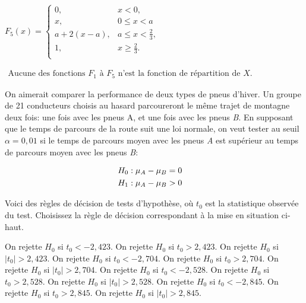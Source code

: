 \begin{questions}
\begin{checkboxes}
     \vspace{0.3cm}
     \CorrectChoice $F_5(x)=\left\{\begin{array}{ll}
     0, & x<0,\\
     x, & 0\le x<a \\ 
     a+2(x-a), & a\le x < \frac{2}{3}, \\ 
     1, & x\ge\frac{2}{3}.\\
     \end{array}\right.$

\vspace{0.3cm}
     \choice $\begin{array}{ll}
     \text{Aucune des fonctions\ } 
     \text{$F_1$ à $F_5$ n'est la\ } 
     \text{fonction de répartition de $X$.}
     \end{array}$
  \end{checkboxes}\medskip


 \question[4]

On aimerait comparer la performance de deux types de pneus d'hiver. Un groupe de 21 conducteurs choisis au hasard parcoureront le même trajet de montagne deux fois: une fois avec les pneus {A}, et une fois avec les pneus {\it B}. En supposant que le temps de parcours de la route suit une loi normale, on veut tester au seuil $\alpha=0,01$ si le temps de parcours moyen avec les pneus {\it A} est supérieur au temps de parcours moyen avec les pneus {\it B}:



\begin{align*}
    H_0&:\mu_{A} - \mu_{B} = 0 \cr
    H_1&:\mu_{A} - \mu_{B} > 0
\end{align*}

Voici des règles de décision de tests d'hypothèse, où $t_0$ est la statistique observée du test. Choisissez la règle de décision correspondant à la mise en situation ci-haut.

\begin{checkboxes}
    \choice On rejette $H_0$ si $t_0 < -2,423$.
    \choice On rejette $H_0$ si $t_0 > 2,423$.
    \choice On rejette $H_0$ si $|t_0| > 2,423$.
    \choice On rejette $H_0$ si $t_0 < -2,704$.
    \choice On rejette $H_0$ si $t_0 > 2,704$.
    \choice On rejette $H_0$ si $|t_0| > 2,704$.
    \choice On rejette $H_0$ si $t_0 < -2,528$.
    \correctchoice On rejette $H_0$ si $t_0 > 2,528$.
    \choice On rejette $H_0$ si $|t_0| > 2,528$.
    \choice On rejette $H_0$ si $t_0 < -2,845$.
    \choice On rejette $H_0$ si $t_0 > 2,845$.
    \choice On rejette $H_0$ si $|t_0| > 2,845$.
\end{checkboxes}
\pageblanche
 

\end{questions}
